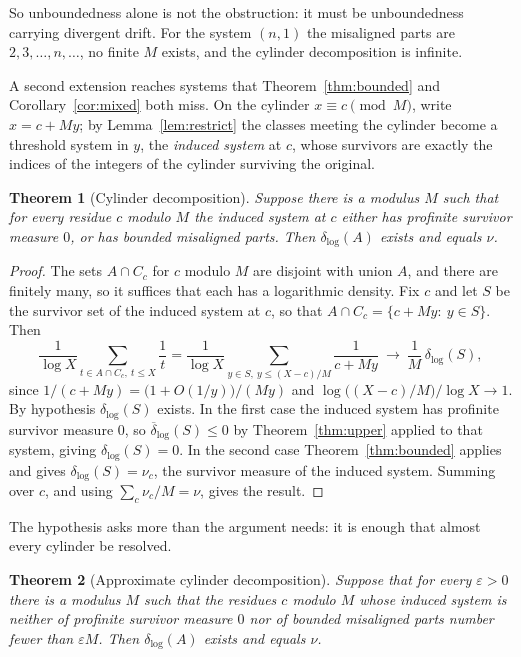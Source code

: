 \documentclass[11pt]{article}
\theoremstyle{plain}
\newtheorem{theorem}{Theorem}[section]
\theoremstyle{definition}
\newcommand{\dlog}{\delta_{\log}}
\begin{document}
So unboundedness alone is not the obstruction: it must be
unboundedness carrying divergent drift.  For the system $(n,1)$
the misaligned parts are
$2,3,\dots,n,\dots$, no finite $M$ exists, and the cylinder
decomposition is infinite.

A second extension reaches systems that Theorem~\ref{thm:bounded}
and Corollary~\ref{cor:mixed} both miss.  On the cylinder
$x\equiv c\pmod M$, write $x=c+My$; by Lemma~\ref{lem:restrict}
the classes meeting the cylinder become a threshold system in
$y$, the \emph{induced system} at $c$, whose survivors are
exactly the indices of the integers of the cylinder surviving
the original.

\begin{theorem}[Cylinder decomposition]\label{thm:cyl}
Suppose there is a modulus $M$ such that for every residue $c$
modulo $M$ the induced system at $c$ either has profinite
survivor measure $0$, or has bounded misaligned parts.  Then
$\dlog(A)$ exists and equals $\nu$.
\end{theorem}

\begin{proof}
The sets $A\cap C_c$ for $c$ modulo $M$ are disjoint with union
$A$, and there are finitely many, so it suffices that each has a
logarithmic density.  Fix $c$ and let $S$ be the survivor set of
the induced system at $c$, so that $A\cap C_c=\{c+My:\ y\in S\}$.
Then
\[
  \frac{1}{\log X}\sum_{t\in A\cap C_c,\ t\le X}\frac1t
  =\frac{1}{\log X}\sum_{y\in S,\ y\le (X-c)/M}\frac{1}{c+My}
  \ \longrightarrow\ \frac{1}{M}\,\dlog(S),
\]
since $1/(c+My)=\bigl(1+O(1/y)\bigr)/(My)$ and
$\log\bigl((X-c)/M\bigr)/\log X\to1$.  By hypothesis $\dlog(S)$
exists.  In the first case the induced system has profinite
survivor measure $0$, so $\overline{\delta}_{\log}(S)\le0$ by
Theorem~\ref{thm:upper} applied to that system, giving
$\dlog(S)=0$.  In the second case Theorem~\ref{thm:bounded} applies and gives
$\dlog(S)=\nu_c$, the survivor measure of the induced system.
Summing over $c$, and using $\sum_c\nu_c/M=\nu$, gives the
result.
\end{proof}

The hypothesis asks more than the argument needs: it is enough
that almost every cylinder be resolved.

\begin{theorem}[Approximate cylinder decomposition]\label{thm:cylapp}
Suppose that for every $\varepsilon>0$ there is a modulus $M$
such that the residues $c$ modulo $M$ whose induced system is
neither of profinite survivor measure $0$ nor of bounded
misaligned parts number fewer than $\varepsilon M$.  Then $\dlog(A)$ exists and equals $\nu$.
\end{theorem}
\end{document}
